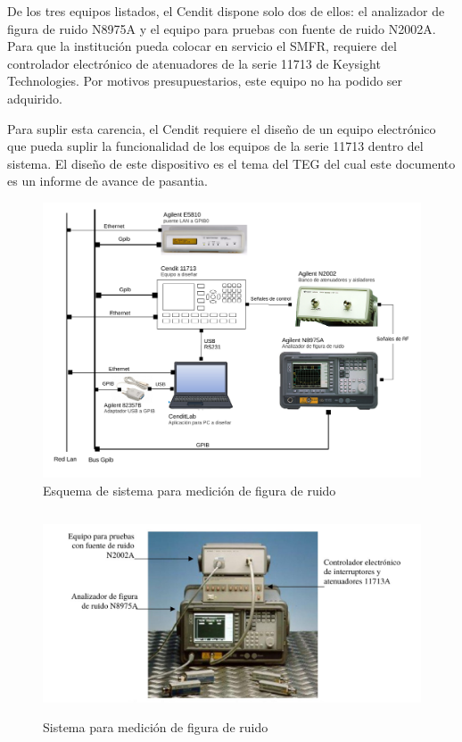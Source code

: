 \documentclass[paper=letter,oneside,fontsize=11pt, parskip=full]{scrartcl}
\begin{document}
	De los tres equipos listados, el Cendit dispone solo dos de ellos: el analizador de figura de ruido N8975A y el equipo para pruebas con fuente de ruido N2002A. Para que la institución pueda colocar en servicio el SMFR, requiere del controlador electrónico de atenuadores de la serie 11713 de Keysight Technologies. Por motivos presupuestarios, este equipo no ha podido ser adquirido.
	
	Para suplir esta carencia, el Cendit requiere el diseño de un equipo electrónico que pueda suplir la funcionalidad de los equipos de la serie 11713 dentro del sistema. El diseño de este dispositivo es el tema del TEG del cual este documento es un informe de avance de pasantia.
	
	\begin{figure}[h!]
		\begin{center}
			\includegraphics[width=17cm]{Imagenes/DiagramaBloquesSistema.pdf}
			\caption{Esquema de sistema para medición de figura de ruido}
			\label{Fig:SistemaMediciónFiguraRuido}
		\end{center}
	\end{figure}			
	
	
	\begin{figure}[!h]
		\begin{center}
			\includegraphics[height=6cm]{Imagenes/SistemaMedicionFiguraRuido.pdf}
			\caption{Sistema para medición de figura de ruido}
			\label{Fig:SistemaMedicionFiguraRuido}
		\end{center}	
	\end{figure}	
\end{document}
